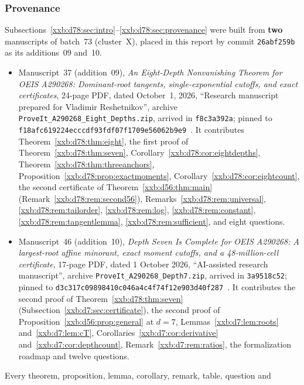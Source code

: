 \documentclass[11pt,a4paper]{article}
\numberwithin{equation}{section}
\theoremstyle{definition}
\theoremstyle{remark}
\theoremstyle{plain}
\begin{document}
\subsubsection{Provenance}

Subsections~\ref{xxb:d78:sec:intro}--\ref{xxb:d78:sec:provenance} were built
from \textbf{two} manuscripts of batch~73 (cluster~X), placed in this report by
commit \texttt{26abf259b} as its additions~09 and~10.
\begin{itemize}[leftmargin=1.4em,itemsep=1pt]
\item Manuscript~37 (addition~09), \emph{An Eight-Depth Nonvanishing Theorem
 for OEIS A290268: Dominant-root tangents, single-exponential cutoffs, and exact
 certificates}, 24-page PDF, dated October~1, 2026, ``Research manuscript
 prepared for Vladimir Reshetnikov'', archive
 \texttt{ProveIt\_\allowbreak A290268\_\allowbreak Eight\_\allowbreak Depths.zip},
 arrived in \texttt{f8c3a392a}; pinned to
 \texttt{f18afc619224ecccdf93fdf07f1709e56062b9e9}~\cite{xxbd78-repo}.  It contributes
 Theorem~\ref{xxb:d78:thm:eight}, the first proof of
 Theorem~\ref{xxb:d78:thm:seven}, Corollary~\ref{xxb:d78:cor:eightdepths},
 Theorem~\ref{xxb:d78:thm:threeanchors}, Proposition~\ref{xxb:d78:prop:exactmoments},
 Corollary~\ref{xxb:d78:cor:eightcount}, the second certificate of
 Theorem~\ref{xxb:d56:thm:main} (Remark~\ref{xxb:d78:rem:second56}),
 Remarks~\ref{xxb:d78:rem:universal}, \ref{xxb:d78:rem:tailorder},
 \ref{xxb:d78:rem:log}, \ref{xxb:d78:rem:constant},
 \ref{xxb:d78:rem:tangentlemma}, \ref{xxb:d78:rem:sufficient}, and eight
 questions.
\item Manuscript~46 (addition~10), \emph{Depth Seven Is Complete for OEIS
 A290268: A largest-root affine minorant, exact moment cutoffs, and a
 48-million-cell certificate}, 17-page PDF, dated 1 October 2026,
 ``AI-assisted research manuscript'', archive
 \texttt{ProveIt\_\allowbreak A290268\_\allowbreak Depth7.zip}, arrived in
 \texttt{3a9518c52}; pinned to
 \texttt{d3c317c09898410c046a4c4f74f12e903d40f287}~\cite{xxbd7-proveit}.  It contributes the second
 proof of Theorem~\ref{xxb:d78:thm:seven}
 (Subsection~\ref{xxb:d7:sec:certificate}), the second proof of
 Proposition~\ref{xxb:d56:prop:general} at $d=7$, Lemmas~\ref{xxb:d7:lem:roots}
 and~\ref{xxb:d7:lem:cT}, Corollaries~\ref{xxb:d7:cor:derivative}
 and~\ref{xxb:d7:cor:depthcount}, Remark~\ref{xxb:d7:rem:ratios}, the
 formalization roadmap and twelve questions.
\end{itemize}
Every theorem, proposition, lemma, corollary, remark, table, question and
\end{document}
